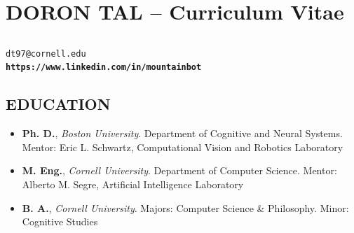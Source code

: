 \documentclass[conference,lettersize,twocolumn,twosize]{./IEEEtran}
\begin{document}
\pagestyle{empty}
\section*{\bf \large{DORON TAL -- Curriculum Vitae}}
\subsection*{}
\begin{center}
  {\tt dt97@cornell.edu}\\
  {\tt \bf https://www.linkedin.com/in/mountainbot}\\
\end{center}
\subsection*{EDUCATION}
\begin{center}
  \begin{itemize}
  \item{{\bf Ph. D.}, \emph{Boston University}.
    Department of Cognitive and Neural Systems.  Mentor: Eric
    L. Schwartz, Computational Vision and Robotics Laboratory}
  \item{{\bf M. Eng.}, \emph{Cornell University}.
    Department of Computer Science.  Mentor: Alberto M. Segre,
    Artificial Intelligence Laboratory}
  \item{{\bf B. A.}, \emph{Cornell University}.
    Majors: Computer Science \& Philosophy. Minor: Cognitive
    Studies}
  \end{itemize}
\end{center}
\end{document}
